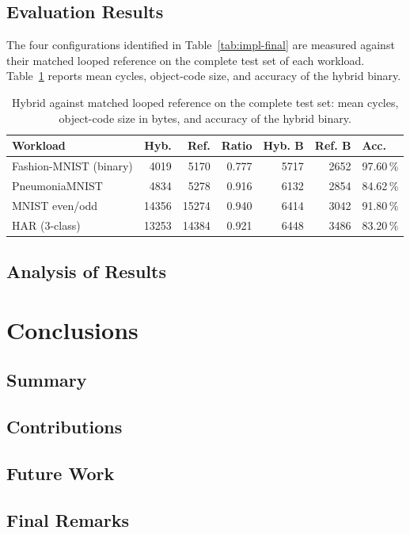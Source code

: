\section{Evaluation Results}
\label{sec:eval-results}

The four configurations identified in Table~\ref{tab:impl-final} are measured against their matched looped reference on the complete test set of each workload.
Table~\ref{tab:eval-headline} reports mean cycles, object-code size, and accuracy of the hybrid binary.

\begin{table}[H]
	\centering
	\small
	\caption{Hybrid against matched looped reference on the complete test set: mean cycles, object-code size in bytes, and accuracy of the hybrid binary.}
	\label{tab:eval-headline}
	\begin{tabularx}{\textwidth}{@{}>{\raggedright\arraybackslash}p{}rrrrrX@{}}
		\toprule
		\textbf{Workload} & \textbf{Hyb.} & \textbf{Ref.} & \textbf{Ratio} & \textbf{Hyb. B} & \textbf{Ref. B} & \textbf{Acc.} \\
		\midrule
		Fashion-MNIST (binary) & 4019 & 5170 & 0.777 & 5717 & 2652 & 97.60\,\% \\
		PneumoniaMNIST & 4834 & 5278 & 0.916 & 6132 & 2854 & 84.62\,\% \\
		MNIST even/odd & 14356 & 15274 & 0.940 & 6414 & 3042 & 91.80\,\% \\
		HAR (3-class) & 13253 & 14384 & 0.921 & 6448 & 3486 & 83.20\,\% \\
		\bottomrule
	\end{tabularx}
\end{table}

\section{Analysis of Results}


\chapter{Conclusions}
\label{ch:closure}


\section{Summary}

\section{Contributions}

\section{Future Work}

\section{Final Remarks}
